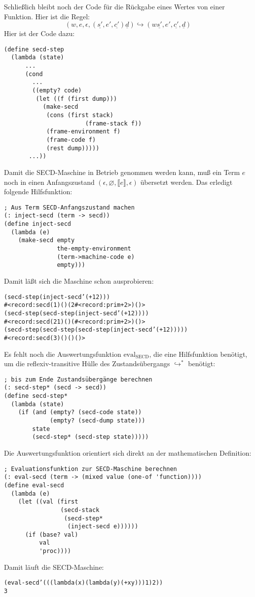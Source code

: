 %
Schließlich bleibt noch der Code für die Rückgabe eines Wertes von
einer Funktion.  Hier ist die Regel:
%
\begin{displaymath}
  (w, e, \epsilon, (\underline{s'}, e', \underline{c'}) \underline{d})
  \hookrightarrow
  (w\underline{s'}, e', \underline{c'}, \underline{d})
\end{displaymath}
%
Hier ist der Code dazu:
%
\begin{verbatim}
(define secd-step
  (lambda (state)
      ...
      (cond
        ...
        ((empty? code)
         (let ((f (first dump)))
           (make-secd
            (cons (first stack)
                       (frame-stack f))
            (frame-environment f)
            (frame-code f)
            (rest dump)))))
       ...))
\end{verbatim}
%
Damit die SECD-Maschine in Betrieb genommen werden kann, muß ein Term
$e$ noch in einen Anfangszustand $(\epsilon, \varnothing, \llbracket
e\rrbracket, \epsilon)$ übersetzt werden.  Das erledigt folgende
Hilfsfunktion:
%
\begin{verbatim}
; Aus Term SECD-Anfangszustand machen
(: inject-secd (term -> secd))
(define inject-secd
  (lambda (e)
    (make-secd empty
               the-empty-environment
               (term->machine-code e)
               empty)))
\end{verbatim}
%
Damit läßt sich die Maschine schon ausprobieren:
%
\begin{alltt}
(secd-step (inject-secd '(+ 1 2)))
\evalsto{}#<record:secd (1) () (2 #<record:prim + 2>) ()>
(secd-step (secd-step (inject-secd '(+ 1 2))))
\evalsto{}#<record:secd (2 1) () (#<record:prim + 2>) ()>
(secd-step (secd-step (secd-step (inject-secd '(+ 1 2)))))
\evalsto{}#<record:secd (3) () () ()>
\end{alltt}
%
Es fehlt noch die Auswertungsfunktion $\mathrm{eval}_\mathrm{SECD}$,
die eine Hilfsfunktion benötigt, um die reflexiv-transitive Hülle des
Zustandsübergangs $\hookrightarrow^*$ benötigt:
%
\begin{verbatim}
; bis zum Ende Zustandsübergänge berechnen
(: secd-step* (secd -> secd))
(define secd-step*
  (lambda (state)
    (if (and (empty? (secd-code state))
             (empty? (secd-dump state)))
        state
        (secd-step* (secd-step state)))))
\end{verbatim}
%
Die Auswertungsfunktion orientiert sich direkt an der mathematischen
Definition:
%
\begin{verbatim}
; Evaluationsfunktion zur SECD-Maschine berechnen
(: eval-secd (term -> (mixed value (one-of 'function))))
(define eval-secd
  (lambda (e)
    (let ((val (first
                (secd-stack
                 (secd-step* 
                  (inject-secd e))))))
      (if (base? val)
          val
          'proc))))
\end{verbatim}
%
Damit läuft die SECD-Maschine:
%
\begin{alltt}
(eval-secd '(((lambda (x) (lambda (y) (+ x y))) 1) 2))
\evalsto{}3
\end{alltt}

